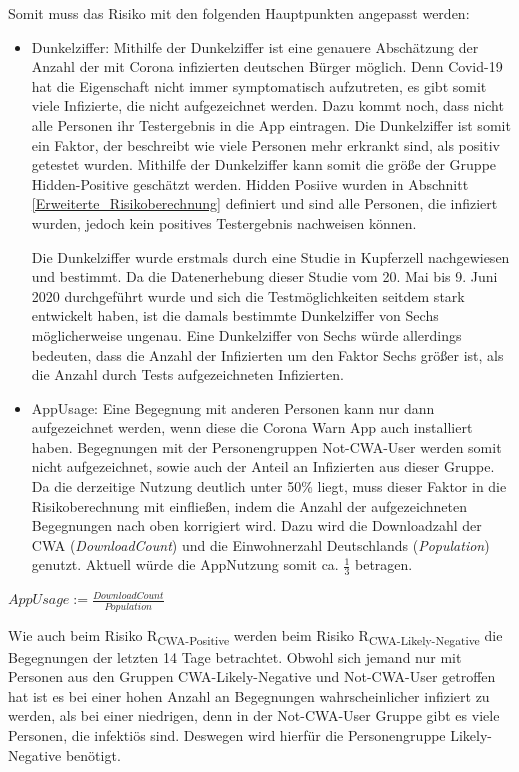 \documentclass[conference,compsoc]{IEEEtran}
\begin{document}
Somit muss das Risiko mit den folgenden Hauptpunkten angepasst werden:

\begin{itemize}
	\item Dunkelziffer: Mithilfe der Dunkelziffer ist eine genauere Abschätzung der Anzahl der mit Corona infizierten deutschen Bürger möglich. 
	Denn Covid-19 hat die Eigenschaft nicht immer symptomatisch aufzutreten, es gibt somit viele Infizierte, 
	die nicht aufgezeichnet werden. Dazu kommt noch, dass nicht alle Personen ihr Testergebnis in die App eintragen.
	Die Dunkelziffer ist somit  ein Faktor, der beschreibt wie viele Personen mehr erkrankt sind, 
	als positiv getestet wurden. Mithilfe der Dunkelziffer kann somit die größe der Gruppe Hidden-Positive geschätzt werden.
	Hidden Posiive wurden in Abschnitt \ref{Erweiterte_Risikoberechnung} definiert und sind alle Personen, die infiziert wurden, jedoch kein positives Testergebnis nachweisen können. 

	Die Dunkelziffer wurde erstmals durch eine Studie in Kupferzell \cite{Dunkelziffer} nachgewiesen und bestimmt. 
	Da die Datenerhebung dieser Studie vom 20. Mai bis 9. Juni 2020 durchgeführt wurde und sich die Testmöglichkeiten seitdem stark entwickelt haben, 
	ist die damals bestimmte Dunkelziffer von Sechs möglicherweise ungenau. 
	Eine Dunkelziffer von Sechs würde allerdings bedeuten, dass die Anzahl der Infizierten um den Faktor Sechs größer ist, 
	als die Anzahl durch Tests aufgezeichneten Infizierten.
	\item  AppUsage: Eine Begegnung mit anderen Personen kann nur dann aufgezeichnet werden, wenn diese die Corona Warn App auch installiert haben. 
	Begegnungen mit der Personengruppen Not-CWA-User werden somit nicht aufgezeichnet, sowie auch der Anteil an Infizierten aus dieser Gruppe. 
	Da die derzeitige Nutzung deutlich unter 50\% liegt, muss dieser Faktor in die Risikoberechnung mit einfließen, 
	indem die Anzahl der aufgezeichneten Begegnungen nach oben korrigiert wird. 
	Dazu wird die Downloadzahl der CWA (\textit{DownloadCount}) \cite{Downloads} und die Einwohnerzahl Deutschlands (\textit{Population}) \cite{Einwohnerzahl} genutzt. 
	Aktuell würde die AppNutzung somit ca. $\frac{1}{3}$ betragen.
\end{itemize}

\centerline{\text{ }}
\centerline{$AppUsage := \frac{DownloadCount}{Population}$}
\centerline{\text{ }}

Wie auch beim Risiko R\textsubscript{CWA-Positive} werden beim Risiko R\textsubscript{CWA-Likely-Negative} die Begegnungen der letzten 14 Tage betrachtet.
Obwohl sich jemand nur mit Personen aus den Gruppen CWA-Likely-Negative und Not-CWA-User getroffen hat
ist es bei einer hohen Anzahl an Begegnungen wahrscheinlicher infiziert zu werden, als bei einer niedrigen, denn in der Not-CWA-User Gruppe gibt es viele Personen, die infektiös sind. 
Deswegen wird hierfür die Personengruppe Likely-Negative benötigt. 
\end{document}
